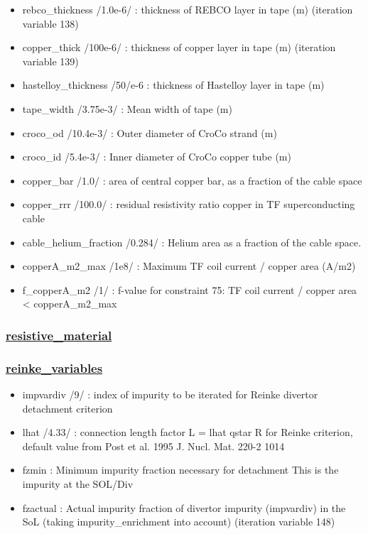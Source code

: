 \documentclass[]{article}
\providecommand{\tightlist}{%
  \setlength{\itemsep}{0pt}\setlength{\parskip}{0pt}}
\begin{document}
\begin{itemize}
\tightlist
\item
  rebco\_thickness /1.0e-6/ : thickness of REBCO layer in tape (m)
  (iteration variable 138)
\item
  copper\_thick /100e-6/ : thickness of copper layer in tape (m)
  (iteration variable 139)
\item
  hastelloy\_thickness /50/e-6 : thickness of Hastelloy layer in tape
  (m)
\item
  tape\_width /3.75e-3/ : Mean width of tape (m)
\item
  croco\_od /10.4e-3/ : Outer diameter of CroCo strand (m)
\item
  croco\_id /5.4e-3/ : Inner diameter of CroCo copper tube (m)
\item
  copper\_bar /1.0/ : area of central copper bar, as a fraction of the
  cable space
\item
  copper\_rrr /100.0/ : residual resistivity ratio copper in TF
  superconducting cable
\item
  cable\_helium\_fraction /0.284/ : Helium area as a fraction of the
  cable space.
\item
  copperA\_m2\_max /1e8/ : Maximum TF coil current / copper area (A/m2)
\item
  f\_copperA\_m2 /1/ : f-value for constraint 75: TF coil current /
  copper area \textless{} copperA\_m2\_max
\end{itemize}

\subsubsection{\texorpdfstring{\href{resistive_material.html}{resistive\_material}}{resistive\_material}}\label{resistive_material}

\subsubsection{\texorpdfstring{\href{reinke_variables.html}{reinke\_variables}}{reinke\_variables}}\label{reinke_variables}

\begin{itemize}
\tightlist
\item
  impvardiv /9/ : index of impurity to be iterated for Reinke divertor
  detachment criterion
\item
  lhat /4.33/ : connection length factor L\textbar{}\textbar{} = lhat
  qstar R for Reinke criterion, default value from Post et al. 1995 J.
  Nucl. Mat. 220-2 1014
\item
  fzmin : Minimum impurity fraction necessary for detachment This is the
  impurity at the SOL/Div
\item
  fzactual : Actual impurity fraction of divertor impurity (impvardiv)
  in the SoL (taking impurity\_enrichment into account) (iteration
  variable 148)
\end{itemize}
\end{document}
